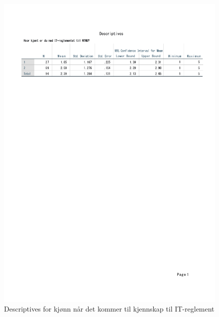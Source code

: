 \begin{figure}[H]
    \centering
    \includegraphics[scale=0.6]{case_1/bilder/kjonn_kjent_descriptive.pdf}
    \caption[Descriptives av kjønn på kjennskap til IT-reglement]{Descriptives for kjønn når det kommer til kjennskap til IT-reglement}
    \label{fig:fakultet_pastander_descriptive}
\end{figure}

